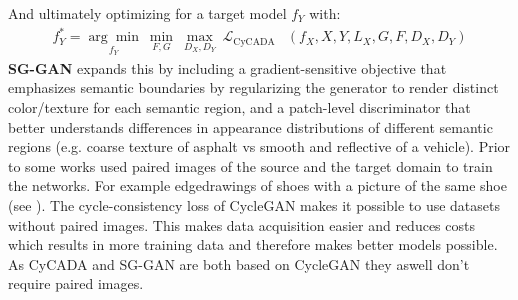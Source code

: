 And ultimately optimizing for a target model $f_Y$ with:
\begin{align}
	f^*_Y = \underset{f_Y}{\arg\min} ~ \underset{F,G}{\min} ~ \underset{D_X, D_Y}{\max} ~ \mathcal{L}_{\text{CyCADA}}&(f_X, X, Y, L_X, G, F, D_X, D_Y)
\end{align}
\textbf{SG-GAN} \cite{DBLP:journals/corr/abs-1801-01726} expands this by including a gradient-sensitive objective that emphasizes semantic boundaries by regularizing the generator to render distinct color/texture for each semantic region, and a patch-level discriminator that better understands differences in appearance distributions of different semantic regions (e.g. coarse texture of asphalt vs smooth and reflective of a vehicle). Prior to \cite{DBLP:journals/corr/ZhuPIE17} some works used paired images of the source and the target domain to train the networks. For example edgedrawings of shoes with a picture of the same shoe (see \cite{DBLP:journals/corr/IsolaZZE16}). The cycle-consistency loss of CycleGAN makes it possible to use datasets without paired images. This makes data acquisition easier and reduces costs which results in more training data and therefore makes better models possible. As CyCADA and SG-GAN are both based on CycleGAN they aswell don't require paired images.




